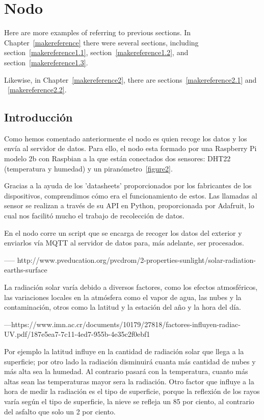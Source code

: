 \cleardoublepage

\chapter{Nodo}
\label{makereference4}

Here are more examples of referring to previous sections.  In
Chapter~\ref{makereference} there were several sections, including
section~\ref{makereference1.1}, section~\ref{makereference1.2},
and section~\ref{makereference1.3}.

Likewise, in Chapter~\ref{makereference2}, there are
sections~\ref{makereference2.1} and ~\ref{makereference2.2}.

\section{Introducción}
\label{makereference4.1}


Como hemos comentado anteriormente el nodo es quien recoge los datos y los envía al servidor de datos.
Para ello, el nodo esta formado por una Raspberry Pi modelo 2b con Raspbian a la que están conectados dos sensores: DHT22 (temperatura y humedad) y un piranómetro~\ref{figure2}.

Gracias a la ayuda de los 'datasheets' proporcionados por los fabricantes de los dispositivos, comprendimos cómo era el funcionamiento de estos. 
Las llamadas al sensor se realizan a través de su API en Python, proporcionada por Adafruit, lo cual nos facilitó mucho el trabajo de recolección de datos.

En el nodo corre un script que se encarga de recoger los datos del exterior y enviarlos vía MQTT al servidor de datos para, más adelante, ser procesados.

-----
http://www.pveducation.org/pvcdrom/2-properties-sunlight/solar-radiation-earths-surface

La radiación solar varía debido a diversos factores, como los efectos atmosféricos, las variaciones locales en la atmósfera como el vapor de agua, las nubes y la contaminación, otros como la latitud y la estación del año y la hora del día.

---https://www.imn.ac.cr/documents/10179/27818/factores-influyen-radiac-UV.pdf/187e5ea7-7c11-4ed7-955b-4e35c2f0ebf1

Por ejemplo la latitud influye en la cantidad de radiación solar que llega a la superficie; por otro lado la radiación disminuirá cuanta más cantidad de nubes y más alta sea la humedad. Al contrario pasará con la temperatura, cuanto más altas sean las temperaturas mayor sera la radiación. Otro factor que influye a la hora de medir la radiación es el tipo de superficie, porque la reflexión de los rayos varía según el tipo de superficie, la nieve se refleja un 85 por ciento, al contrario del asfalto que solo un 2 por ciento.

